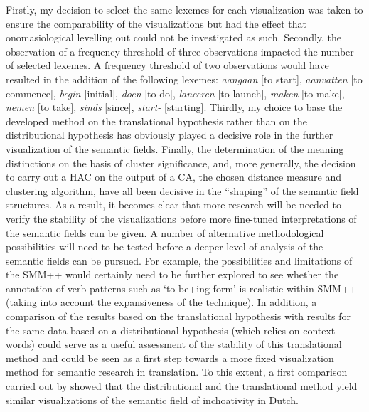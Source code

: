 Firstly, my decision to select the same lexemes for each visualization was taken to ensure the comparability of the visualizations but had the effect that onomasiological levelling out could not be investigated as such. Secondly, the observation of a frequency threshold of three observations impacted the number of selected lexemes. A frequency threshold of two observations would have resulted in the addition of the following lexemes: \textit{aangaan} [to start], \textit{aanvatten} [to commence], \textit{begin-}[initial], \textit{doen} [to do], \textit{lanceren} [to launch], \textit{maken} [to make], \textit{nemen} [to take], \textit{sinds} [since], \textit{start-} [starting]. Thirdly, my choice to base the developed method on the translational hypothesis rather than on the distributional hypothesis has obviously played a decisive role in the further visualization of the semantic fields. Finally, the determination of the meaning distinctions on the basis of cluster significance, and, more generally, the decision to carry out a HAC on the output of a CA, the chosen distance measure and clustering algorithm, have all been decisive in the ``shaping'' of the semantic field structures. As a result, it becomes clear that more research will be needed to verify the stability of the visualizations before more fine-tuned interpretations of the semantic fields can be given. A number of alternative methodological possibilities will need to be tested before a deeper level of analysis of the semantic fields can be pursued. For example, the possibilities and limitations of the SMM++ would certainly need to be further explored to see whether the annotation of verb patterns such as ‘to be+ing-form’ is realistic within SMM++ (taking into account the expansiveness of the technique). In addition, a comparison of the results based on the translational hypothesis with results for the same data based on a distributional hypothesis (which relies on context words) could serve as a useful assessment of the stability of this translational method and could be seen as a first step towards a more fixed visualization method for semantic research in translation. To this extent, a first comparison carried out by \citet{vandevoorde_distributional_2016} showed that the distributional and the translational method yield similar visualizations of the semantic field of inchoativity in Dutch.

